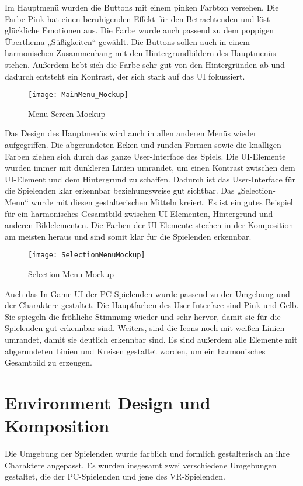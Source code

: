 Im Hauptmenü wurden die Buttons mit einem pinken Farbton versehen. Die Farbe Pink hat einen beruhigenden Effekt für den Betrachtenden und löst glückliche Emotionen aus. Die Farbe wurde auch passend zu dem poppigen Überthema „Süßigkeiten“ gewählt. Die Buttons sollen auch in einem harmonischen Zusammenhang mit den Hintergrundbildern des Hauptmenüs stehen. Außerdem hebt sich die Farbe sehr gut von den Hintergründen ab und dadurch entsteht ein Kontrast, der sich stark auf das UI fokussiert. 

\begin{figure}[H]
	\centering
	\texttt{[image: MainMenu\_Mockup]}
	\caption{Menu-Screen-Mockup}
\end{figure}

Das Design des Hauptmenüs wird auch in allen anderen Menüs wieder aufgegriffen. Die abgerundeten Ecken und runden Formen sowie die knalligen Farben ziehen sich durch das ganze User-Interface des Spiels. Die UI-Elemente wurden immer mit dunkleren Linien umrandet, um einen Kontrast zwischen dem UI-Element und dem Hintergrund zu schaffen. Dadurch ist das User-Interface für die Spielenden klar erkennbar beziehungsweise gut sichtbar. Das „Selection-Menu“ wurde mit diesen gestalterischen Mitteln kreiert. Es ist ein gutes Beispiel für ein harmonisches Gesamtbild zwischen UI-Elementen, Hintergrund und anderen Bildelementen. Die Farben der UI-Elemente stechen in der Komposition am meisten heraus und sind somit klar für die Spielenden erkennbar.

\begin{figure}[H]
	\centering
	\texttt{[image: SelectionMenuMockup]}
	\caption{Selection-Menu-Mockup}
\end{figure}

Auch das In-Game UI der PC-Spielenden wurde passend zu der Umgebung und der Charaktere gestaltet. Die Hauptfarben des User-Interface sind Pink und Gelb. Sie spiegeln die fröhliche Stimmung wieder und sehr hervor, damit sie für die Spielenden gut erkennbar sind. Weiters, sind die Icons noch mit weißen Linien umrandet, damit sie deutlich erkennbar sind. Es sind außerdem alle Elemente mit abgerundeten Linien und Kreisen gestaltet worden, um ein harmonisches Gesamtbild zu erzeugen.

\section{Environment Design und Komposition}
Die Umgebung der Spielenden wurde farblich und formlich gestalterisch an ihre Charaktere angepasst. Es wurden insgesamt zwei verschiedene Umgebungen gestaltet, die der PC-Spielenden und jene des VR-Spielenden. 

